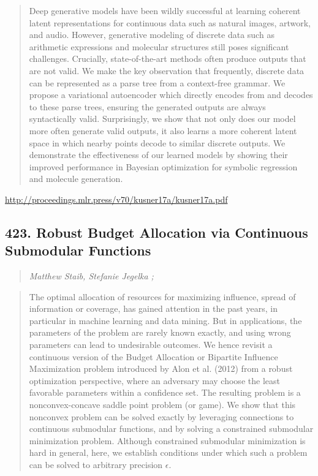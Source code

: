 \documentclass{article}
\begin{document}
\begin{quote}
    Deep generative models have been wildly successful at learning coherent latent representations for continuous data such as natural images, artwork, and audio. However, generative modeling of discrete data such as arithmetic expressions and molecular structures still poses significant challenges. Crucially, state-of-the-art methods often produce outputs that are not valid. We make the key observation that frequently, discrete data can be represented as a parse tree from a context-free grammar. We propose a variational autoencoder which directly encodes from and decodes to these parse trees, ensuring the generated outputs are always syntactically valid. Surprisingly, we show that not only does our model more often generate valid outputs, it also learns a more coherent latent space in which nearby points decode to similar discrete outputs. We demonstrate the effectiveness of our learned models by showing their improved performance in Bayesian optimization for symbolic regression and molecule generation.  \end{quote}

\href{http://proceedings.mlr.press/v70/kusner17a/kusner17a.pdf}{http://proceedings.mlr.press/v70/kusner17a/kusner17a.pdf}

\subsection{423. Robust Budget Allocation via Continuous Submodular Functions}

\begin{quote}
\footnotesize{\textit{Matthew Staib, Stefanie Jegelka ;}}
\end{quote}

\begin{quote}
    The optimal allocation of resources for maximizing influence, spread of information or coverage, has gained attention in the past years, in particular in machine learning and data mining. But in applications, the parameters of the problem are rarely known exactly, and using wrong parameters can lead to undesirable outcomes. We hence revisit a continuous version of the Budget Allocation or Bipartite Influence Maximization problem introduced by Alon et al. (2012) from a robust optimization perspective, where an adversary may choose the least favorable parameters within a confidence set. The resulting problem is a nonconvex-concave saddle point problem (or game). We show that this nonconvex problem can be solved exactly by leveraging connections to continuous submodular functions, and by solving a constrained submodular minimization problem. Although constrained submodular minimization is hard in general, here, we establish conditions under which such a problem can be solved to arbitrary precision $\epsilon$.  \end{quote}
\end{document}
